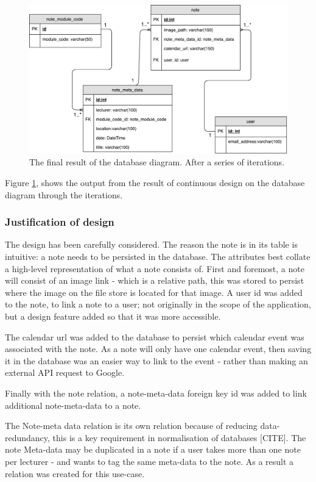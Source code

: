 \begin{figure}[h]
  \centering
  \includegraphics[scale=0.5]{images/database_diagram}
  \caption{The final result of the database diagram. After a series of iterations.}
  \label{fig:database}
\end{figure}

Figure \ref{fig:database}, shows the output from the result of continuous design on the database diagram through the iterations.

\subsubsection{Justification of design}
The design has been carefully considered. The reason the note is in its table is intuitive: a note needs to be persisted in the database. The attributes best collate a high-level representation of what a note consists of. First and foremost,  a note will consist of an image link - which is a relative path, this was stored to persist where the image on the file store is located for that image. A user id was added to the note, to link a note to a user; not originally in the scope of the application, but a design feature added so that it was more accessible.

The calendar url was added to the database to persist which calendar event was associated with the note. As a note will only have one calendar event, then saving it in the database was an easier way to link to the event - rather than making an external API request to Google.

Finally with the note relation, a note-meta-data foreign key id was added to link additional note-meta-data to a note.

The Note-meta data relation is its own relation because of reducing data-redundancy, this is a key requirement in normalisation of databases [CITE]. The note Meta-data may be duplicated in a note if a user takes more than one note per lecturer - and wants to tag the same meta-data to the note. As a result a relation was created for this use-case.

